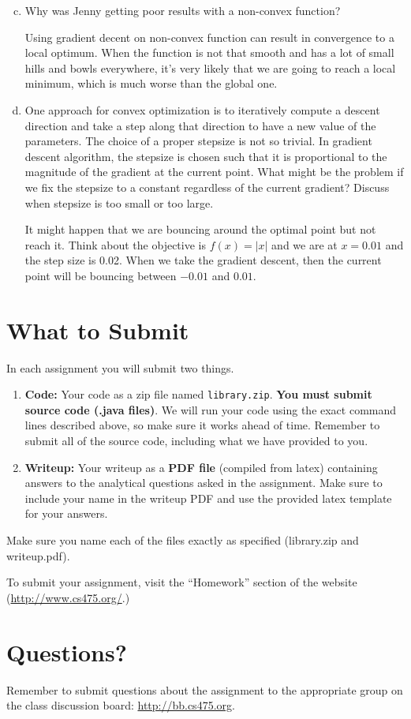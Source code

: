 \documentclass[11pt]{article}
\begin{document}
\begin{enumerate}[(a)]
\setcounter{enumi}{2}
\item Why was Jenny getting poor results with a non-convex function?

Using gradient decent on non-convex function can result in convergence to a local optimum. When the function is not that smooth and has a lot of small hills and bowls everywhere, it's very likely that we are going to reach a local minimum, which is much worse than the global one.

\item One approach for convex optimization is to iteratively compute a descent direction and take a step along that direction to have a new value of the parameters. The choice of a proper stepsize is not so trivial. In gradient descent algorithm, the stepsize is chosen such that it is proportional to the magnitude of the gradient at the current point. What might be the problem if we fix the stepsize to a constant regardless of the current gradient? Discuss when stepsize is too small or too large.

It might happen that we are bouncing around the optimal point but not reach it. Think about the objective is $f(x) = |x|$ and we are at $x = 0.01$ and the step size is 0.02. When we take the gradient descent, then the current point will be bouncing between $-0.01 $ and $0.01$.
\end{enumerate}




\section{What to Submit}
In each assignment you will submit two things.
\begin{enumerate}
\item {\bf Code:} Your code as a zip file named {\tt library.zip}. {\bf You must submit source code (.java files)}. We will run your code using the exact command lines described above, so make sure it works ahead of time. Remember to submit all of the source code, including what we have provided to you.
\item {\bf Writeup:} Your writeup as a {\bf PDF file} (compiled from latex) containing answers to the analytical questions asked in the assignment. Make sure to include your name in the writeup PDF and use the provided latex template for your answers.
\end{enumerate}
Make sure you name each of the files exactly as specified (library.zip and writeup.pdf).

To submit your assignment, visit the ``Homework'' section of the website (\href{http://www.cs475.org/}{http://www.cs475.org/}.)

\section{Questions?}
Remember to submit questions about the assignment to the appropriate group on the class discussion board: \href{http://bb.cs475.org/}{http://bb.cs475.org}.
\end{document}
